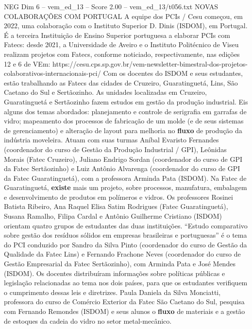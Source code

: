 \begin{textsample}{NEG Dim 6 – vem\_ed\_13 – Score 2.00 – vem\_ed\_13/t056.txt}  \label{ex:f6_neg_045}
NOVAS COLABORAÇÕES COM PORTUGAL A equipe dos PCIs / Cesu começou, em 2022, uma colaboração com o Instituto Superior D.
Dinis (ISDOM), em Portugal.
É a terceira Instituição de Ensino Superior portuguesa a elaborar PCIs com Fatecs: desde 2021, a Universidade de Aveiro e o Instituto Politécnico de Viseu realizam projetos com Fatecs, conforme noticiado, respectivamente, nas edições 12 e 6 de VEm: https://cesu.cps.sp.gov.br/vem-newsletter-bimestral-dos-projetos-colaborativos-internacionais-pci/ Com os docentes do ISDOM e seus estudantes, estão trabalhando as Fatecs das cidades de Cruzeiro, Guaratinguetá, Lins, São Caetano do Sul e Sertãozinho.
As unidades localizadas em Cruzeiro, Guaratinguetá e Sertãozinho fazem estudos em gestão da produção industrial.
Eis alguns dos temas abordados: planejamento e controle de serigrafia em garrafas de vidro; mapeamento dos processos de fabricação de um molde (e de seus sistemas de gerenciamento) e alteração de layout para melhoria no \textbf{fluxo} de produção da indústria moveleira.
Atuam com suas turmas Aníbal Evaristo Fernandes (coordenador do curso de Gestão da Produção Industrial / GPI), Leônidas Morais (Fatec Cruzeiro), Juliano Endrigo Sordan (coordenador do curso de GPI da Fatec Sertãozinho) e Luiz Antônio Alvarenga (coordenador do curso de GPI da Fatec Guaratinguetá), com a professora Arminda Pata (ISDOM).
Na Fatec de Guaratinguetá, \textbf{existe} mais um projeto, sobre processos, manufatura, embalagem e desenvolvimento de produtos em polímeros e vidros.
Os professores Rosinei Batista Ribeiro, Ana Raquel Elisa Satim Rodrigues (Fatec Guaratinguetá), Susana Ramalho, Filipa Cardal e Antônio Guilherme Cristiano (ISDOM) orientam quatro grupos de estudantes das duas instituições. “Estudo comparativo sobre gestão dos resíduos sólidos em empresas brasileiras e portuguesas” é o tema do PCI conduzido por Sandro da Silva Pinto (coordenador do curso de Gestão da Qualidade da Fatec Lins) e Fernando Frachone Neves (coordenador do curso de Gestão Empresarial da Fatec Sertãozinho), com Arminda Pata e José Mendes (ISDOM).
Os docentes distribuíram informações sobre políticas públicas e legislação relacionadas ao tema nos dois países, para que os estudantes verifiquem o cumprimento dessas leis e diretrizes.
Paula Daniela da Silva Monciatti, professora do curso de Comércio Exterior da Fatec São Caetano do Sul, pesquisa com Fernando Remondes (ISDOM) e seus alunos o \textbf{fluxo} de materiais e a gestão de estoques da cadeia do vidro no setor metal-mecânico.

\end{textsample}
